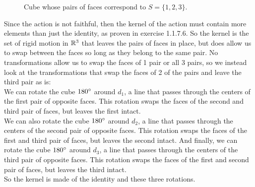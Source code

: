 \documentclass{article}
\begin{document}
\begin{figure}[H]

        \caption{\label{fig:figure1} Cube whose pairs of faces correspond to
        $S = \{1, 2, 3\}$.}
    \end{figure}

    Since the action is not faithful,
    then the kernel of the action must contain more elements
    than just the identity,
    as proven in exercise 1.1.7.6.
    So the kernel is the set of rigid motion in $\mathbb{R}^3$ that leaves the
    pairs of faces in place,
    but does allow us to swap between the faces so long as they belong
    to the same pair.
    No transformations allow us to swap the faces of 1 pair or all 3 pairs,
    so we instead look at the transformations that swap the faces of 2
    of the pairs and leave the third pair as is: \\
    We can rotate the cube $180 \degree$ around $d_1$,
    a line that passes through the centers of the first pair of opposite
    faces. This rotation swaps the faces of the second and third pair
    of faces, but leaves the first intact. \\
    We can also rotate the cube $180 \degree$ around $d_2$,
    a line that passes through the centers of the second pair of opposite
    faces. This rotation swaps the faces of the first and third pair
    of faces, but leaves the second intact.
    And finally, we can rotate the cube $180 \degree$ around $d_3$,
    a line that passes through the centers of the third pair of opposite
    faces. This rotation swaps the faces of the first and second pair
    of faces, but leaves the third intact. \\
    So the kernel is made of the identity and these three rotations.
\end{document}
